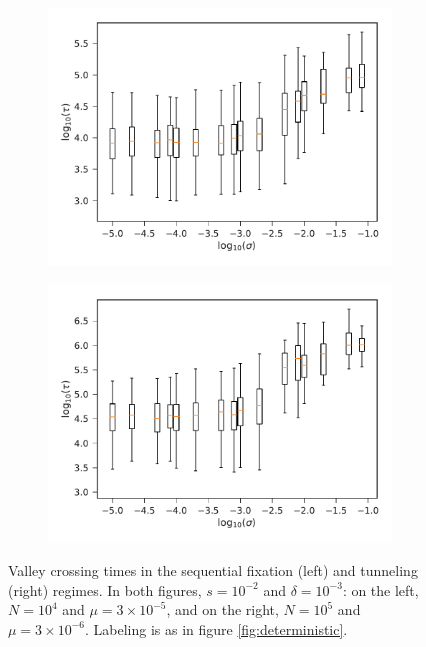 \documentclass[rmp]{revtex4}
\begin{document}
\begin{figure}
\begin{subfigure}[b]{0.4\textwidth}
\includegraphics[width=\textwidth]{Figures/seq_fix.pdf}
\end{subfigure}
\begin{subfigure}[b]{0.4\textwidth}
\includegraphics[width=\textwidth]{Figures/neut_tunnel.pdf}
\end{subfigure}
\caption{Valley crossing times in the sequential fixation (left) and tunneling (right) regimes. In both figures, $s = 10^{-2}$ and $\delta = 10^{-3}$: on the left, $N = 10^4$ and $\mu = 3\times 10^{-5}$, and on the right, $N = 10^5$ and $\mu = 3\times 10^{-6}$. Labeling is as in figure \ref{fig:deterministic}.}
\label{fig:tunneling}
\end{figure}
\end{document}
